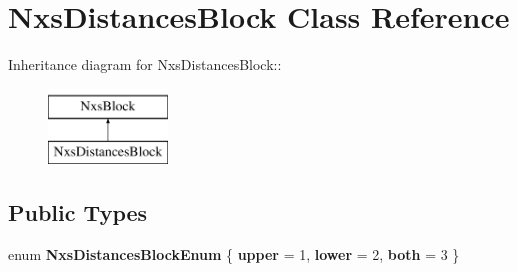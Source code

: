 \hypertarget{classNxsDistancesBlock}{
\section{NxsDistancesBlock Class Reference}
\label{classNxsDistancesBlock}
}
Inheritance diagram for NxsDistancesBlock::\begin{figure}[H]
\begin{center}
\leavevmode
\includegraphics[height=2cm]{classNxsDistancesBlock}
\end{center}
\end{figure}
\subsection*{Public Types}
\begin{DoxyCompactItemize}
\item 
enum {\bfseries NxsDistancesBlockEnum} \{ {\bfseries upper} =  1, 
{\bfseries lower} =  2, 
{\bfseries both} =  3
 \}
\end{DoxyCompactItemize}
